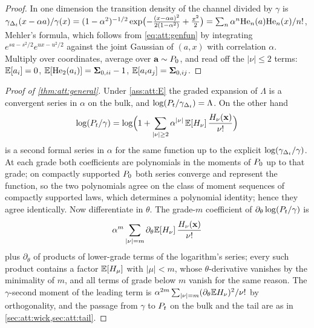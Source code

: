 \begin{proof}
In one dimension the transition density of the channel divided by $\gamma$ is
$\gamma_{\Delta_t}(x-\alpha a)/\gamma(x)=(1-\alpha^2)^{-1/2}\exp\bigl(-\tfrac{(x-\alpha a)^2}{2(1-\alpha^2)}+\tfrac{x^2}2\bigr)=\sum_n\alpha^n\mathrm{He}_{n}(a)\mathrm{He}_{n}(x)/n!$,
Mehler's formula, which follows from \cref{eq:att:genfun} by integrating
$e^{sa-s^2/2}e^{ux-u^2/2}$ against the joint Gaussian of $(a,x)$ with correlation
$\alpha$. Multiply over coordinates, average over $\mathbf{a}\sim P_0$, and read off the
$|\nu|\le2$ terms: $\mathbb{E}[a_i]=0$, $\mathbb{E}[\mathrm{He}_{2}(a_i)]=\mathbf{\Sigma}_{0,ii}-1$, $\mathbb{E}[a_ia_j]=\mathbf{\Sigma}_{0,ij}$.
\end{proof}

\begin{proof}[Proof of \cref{thm:att:general}]
Under \cref{ass:att:E} the graded expansion of $\Lambda$ is a convergent series in
$\alpha$ on the bulk, and $\log(P_t/\gamma_{\Delta_t})=\Lambda$. On the other hand
\[
  \log(P_t/\gamma)=\log\Bigl(1+\sum_{|\nu|\ge2}\alpha^{|\nu|}\,\mathbb{E}[H_\nu]\,\frac{H_\nu(\mathbf{x})}{\nu!}\Bigr)
\]
is a second formal series in $\alpha$ for the same function up to the explicit
$\log(\gamma_{\Delta_t}/\gamma)$. At each grade both coefficients are polynomials in the
moments of $P_0$ up to that grade; on compactly supported $P_0$ both series converge
and represent the function, so the two polynomials agree on the class of moment
sequences of compactly supported laws, which determines a polynomial identity; hence
they agree identically. Now differentiate in $\theta$. The grade-$m$ coefficient of
$\partial_\theta\log(P_t/\gamma)$ is
\[
  \alpha^m\sum_{|\nu|=m}\partial_\theta\mathbb{E}[H_\nu]\,\frac{H_\nu(\mathbf{x})}{\nu!}
\]
plus $\partial_\theta$ of products of lower-grade terms of the logarithm's series; every
such product contains a factor $\mathbb{E}[H_\mu]$ with $|\mu|<m$, whose $\theta$-derivative
vanishes by the minimality of $m$, and all terms of grade below $m$ vanish for the same
reason. The $\gamma$-second moment of the leading term is
$\alpha^{2m}\sum_{|\nu|=m}(\partial_\theta\mathbb{E} H_\nu)^2/\nu!$ by orthogonality, and the
passage from $\gamma$ to $P_t$ on the bulk and the tail are as in
\cref{sec:att:wick,sec:att:tail}.
\end{proof}

